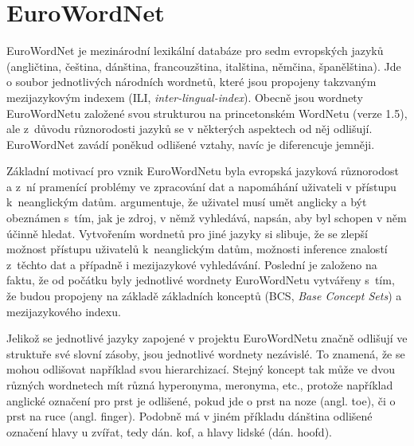 \documentclass[a4paper, 11pt, oneside, showtrims]{book}
\newcommand\ex{\textsf}
\begin{document}
			\section{EuroWordNet} %
			\label{sec:eurowordnet}
				

				EuroWordNet je mezinárodní lexikální databáze pro sedm evropských jazyků (angličtina, čeština, dánština, francouzština, italština, němčina, španělština). Jde o soubor jednotlivých národních wordnetů, které jsou propojeny takzvaným mezijazykovým indexem (ILI, \textit{inter-lingual-index}). Obecně jsou wordnety EuroWordNetu založené svou strukturou na princetonském WordNetu (verze 1.5), ale z~důvodu různorodosti jazyků se v některých aspektech od něj odlišují. EuroWordNet zavádí poněkud odlišené vztahy, navíc je diferencuje jemněji. \parencite{pazienza2008bottom}

				Základní motivací pro vznik EuroWordNetu byla evropská jazyková různorodost a z~ní pramenící problémy ve zpracování dat a napomáhání uživateli v přístupu k~neanglickým datům. \textcite{vossen1997eurowordnet} argumentuje, že uživatel musí umět anglicky a být obeznámen s~tím, jak je zdroj, v němž vyhledává, napsán, aby byl schopen v něm účinně hledat. Vytvořením wordnetů pro jiné jazyky si slibuje, že se zlepší možnost přístupu uživatelů k~neanglickým datům, možnosti inference znalostí z~těchto dat a případně i mezijazykové vyhledávání. Poslední je založeno na faktu, že od počátku byly jednotlivé wordnety EuroWordNetu vytvářeny s~tím, že budou propojeny na základě základních konceptů (BCS, \textit{Base Concept Sets}) a mezijazykového indexu.

				Jelikož se jednotlivé jazyky zapojené v projektu EuroWordNetu značně odlišují ve struktuře své slovní zásoby, jsou jednotlivé wordnety nezávislé. To znamená, že se mohou odlišovat například svou hierarchizací. Stejný koncept tak může ve dvou různých wordnetech mít různá hyperonyma, meronyma, etc., protože například anglické označení pro \ex{prst} je odlišené, pokud jde o \ex{prst na noze} (angl. \ex{toe}), či o prst na ruce (angl. \ex{finger}). Podobně má v jiném příkladu dánština odlišené označení \ex{hlavy u zvířat}, tedy dán. \ex{kof}, a hlavy lidské (dán. \ex{hoofd}). \parencite{vossen1997eurowordnet}
\end{document}
